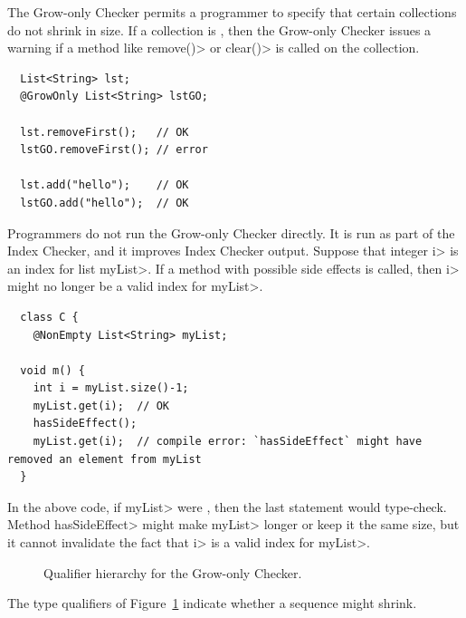 The Grow-only Checker permits a programmer to specify that certain
collections do not shrink in size.  If a collection is
, then the Grow-only Checker
issues a warning if a method like \<remove()> or \<clear()> is called
on the collection.

\begin{Verbatim}
  List<String> lst;
  @GrowOnly List<String> lstGO;

  lst.removeFirst();   // OK
  lstGO.removeFirst(); // error

  lst.add("hello");    // OK
  lstGO.add("hello");  // OK
\end{Verbatim}


Programmers do not run the Grow-only Checker directly.  It is run as part of
the Index Checker, and it improves Index Checker output.  Suppose that integer
\<i> is an index for list \<myList>.  If a method with possible side effects is
called, then \<i> might no longer be a valid index for \<myList>.

\begin{Verbatim}
  class C {
    @NonEmpty List<String> myList;

  void m() {
    int i = myList.size()-1;
    myList.get(i);  // OK
    hasSideEffect();
    myList.get(i);  // compile error: `hasSideEffect` might have removed an element from myList
  }
\end{Verbatim}

In the above code, if \<myList> were
, then the last statement would
type-check.  Method \<hasSideEffect> might make \<myList> longer or keep it the
same size, but it cannot invalidate the fact that \<i> is a valid index for
\<myList>.

\begin{figure}
\begin{center}
\end{center}
\caption{Qualifier hierarchy for the Grow-only Checker.}
\label{growonly-mutability-lattice}
\end{figure}

The type qualifiers of Figure~\ref{growonly-mutability-lattice} indicate whether
a sequence might shrink.

